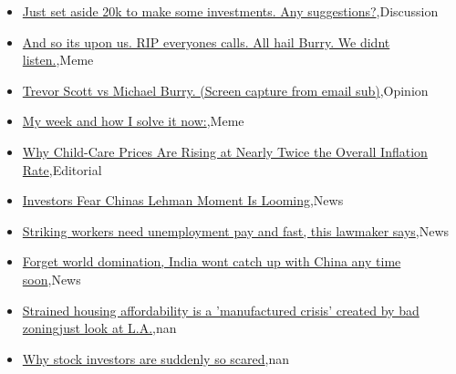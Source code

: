 \documentclass{article}%
\begin{document}
%
\begin{itemize}%
\item%
\href{https://reddit.com/r/wallstreetbets/comments/15v7hir/just\_set\_aside\_20k\_to\_make\_some\_investments\_any/}{Just set aside 20k to make some investments. Any suggestions?},Discussion%
\item%
\href{https://reddit.com/r/wallstreetbets/comments/15v7cp8/and\_so\_its\_upon\_us\_rip\_everyones\_calls\_all\_hail/}{And so its upon us. RIP everyones calls. All hail Burry. We didnt listen.},Meme%
\item%
\href{https://reddit.com/r/StockMarket/comments/15v5izg/trevor\_scott\_vs\_michael\_burry\_screen\_capture\_from/}{Trevor Scott vs Michael Burry. (Screen capture from email sub)},Opinion%
\item%
\href{https://reddit.com/r/StockMarket/comments/15unsg1/my\_week\_and\_how\_i\_solve\_it\_now/}{My week and how I solve it now:},Meme%
\item%
\href{https://reddit.com/r/Economics/comments/15v2uoj/why\_childcare\_prices\_are\_rising\_at\_nearly\_twice/}{Why Child-Care Prices Are Rising at Nearly Twice the Overall Inflation Rate},Editorial%
\item%
\href{https://reddit.com/r/Economics/comments/15uw0xi/investors\_fear\_chinas\_lehman\_moment\_is\_looming/}{Investors Fear Chinas Lehman Moment Is Looming},News%
\item%
\href{https://reddit.com/r/Economics/comments/15uufao/striking\_workers\_need\_unemployment\_pay\_and\_fast/}{Striking workers need unemployment pay  and fast, this lawmaker says},News%
\item%
\href{https://reddit.com/r/Economics/comments/15uucuq/forget\_world\_domination\_india\_wont\_catch\_up\_with/}{Forget world domination, India wont catch up with China any time soon},News%
\item%
\href{https://reddit.com/r/Economics/comments/15utd24/strained\_housing\_affordability\_is\_a\_manufactured/}{Strained housing affordability is a 'manufactured crisis' created by bad zoningjust look at L.A.},nan%
\item%
\href{https://reddit.com/r/Economics/comments/15usjjt/why\_stock\_investors\_are\_suddenly\_so\_scared/}{Why stock investors are suddenly so scared},nan%
\end{itemize}%
\end{document}
